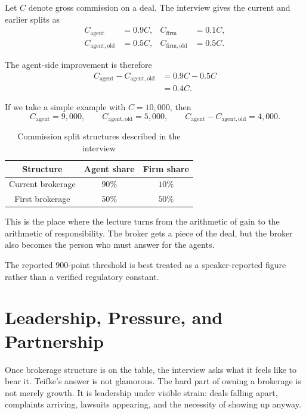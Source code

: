 Let \(C\) denote gross commission on a deal. The interview gives the current and earlier splits as
\begin{align}
C_{\mathrm{agent}} &= 0.9C, &
C_{\mathrm{firm}} &= 0.1C, \\
C_{\mathrm{agent,old}} &= 0.5C, &
C_{\mathrm{firm,old}} &= 0.5C.
\end{align}

The agent-side improvement is therefore
\begin{align}
C_{\mathrm{agent}} - C_{\mathrm{agent,old}}
&= 0.9C - 0.5C \\
&= 0.4C.
\end{align}

If we take a simple example with \(C=10{,}000\), then
\begin{equation}
C_{\mathrm{agent}} = 9{,}000,
\qquad
C_{\mathrm{agent,old}} = 5{,}000,
\qquad
C_{\mathrm{agent}} - C_{\mathrm{agent,old}} = 4{,}000.
\end{equation}

\begin{table}[h]
\centering
\caption{Commission split structures described in the interview}
\begin{tabular}{|c|c|c|}
\hline
Structure & Agent share & Firm share \\
\hline
Current brokerage & \(90\%\) & \(10\%\) \\
First brokerage & \(50\%\) & \(50\%\) \\
\hline
\end{tabular}
\end{table}

This is the place where the lecture turns from the arithmetic of gain to the arithmetic of responsibility. The broker gets a piece of the deal, but the broker also becomes the person who must answer for the agents.

\begin{remark}
The reported \(900\)-point threshold is best treated as a speaker-reported figure rather than a verified regulatory constant.
\end{remark}

\section{Leadership, Pressure, and Partnership}

Once brokerage structure is on the table, the interview asks what it feels like to bear it. Teifke's answer is not glamorous. The hard part of owning a brokerage is not merely growth. It is leadership under visible strain: deals falling apart, complaints arriving, lawsuits appearing, and the necessity of showing up anyway.


